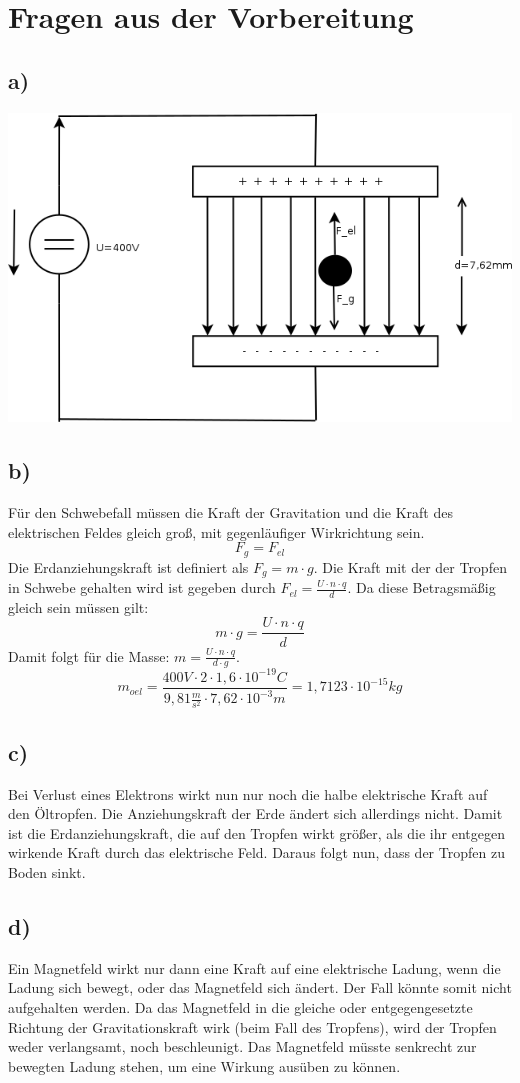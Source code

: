 \section*{Fragen aus der Vorbereitung}
\subsection*{a)}
	\includegraphics[scale=0.4]{Versuchsaufbau.png}
\subsection*{b)}
Für den Schwebefall müssen die Kraft der Gravitation und die Kraft des elektrischen Feldes gleich groß, mit gegenläufiger Wirkrichtung sein.
\[F_g = F_{el}\]
Die Erdanziehungskraft ist definiert als $F_g = m \cdot g$. Die Kraft mit der der Tropfen in Schwebe gehalten wird ist gegeben durch $F_{el} = \frac{U\cdot n \cdot q}{d} $. Da diese Betragsmäßig gleich sein müssen gilt:
\[m \cdot g  = \frac{U\cdot n \cdot q}{d}\]
Damit folgt für die Masse: $m = \frac{U\cdot n \cdot q}{d \cdot g}$.
\[m_{oel} = \frac{400V \cdot 2 \cdot 1,6 \cdot 10^{-19}C}{9,81\frac{m}{s^2} \cdot 7,62 \cdot 10^{-3}m} = 1,7123\cdot10^{-15}kg\]
\subsection*{c)}
Bei Verlust eines Elektrons wirkt nun nur noch die halbe elektrische Kraft auf den Öltropfen. Die Anziehungskraft der Erde ändert sich allerdings nicht. Damit ist die Erdanziehungskraft, die auf den Tropfen wirkt größer, als die ihr entgegen wirkende Kraft durch das elektrische Feld. Daraus folgt nun, dass der Tropfen zu Boden sinkt.
\subsection*{d)}
Ein Magnetfeld wirkt nur dann eine Kraft auf eine elektrische Ladung, wenn die Ladung sich bewegt, oder das Magnetfeld sich ändert. Der Fall könnte somit nicht aufgehalten werden. Da das Magnetfeld in die gleiche oder entgegengesetzte Richtung der Gravitationskraft wirk (beim Fall des Tropfens), wird der Tropfen weder verlangsamt, noch beschleunigt. Das Magnetfeld müsste senkrecht zur bewegten Ladung stehen, um eine Wirkung ausüben zu können.